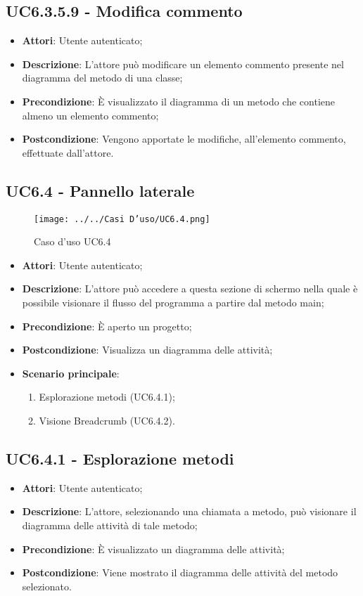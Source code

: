 \subsection{UC6.3.5.9 - Modifica commento} 
\label{ssec:UC6.3.5.9} 
\begin{itemize} 
\item \textbf{Attori}: Utente autenticato;
\item \textbf{Descrizione}: L'attore può modificare un elemento commento presente nel diagramma del metodo di una classe;
\item \textbf{Precondizione}: È visualizzato il diagramma di un metodo che contiene almeno un elemento commento;
\item \textbf{Postcondizione}: Vengono apportate le modifiche, all'elemento commento, effettuate dall'attore.
\end{itemize} 
\newpage
\subsection{UC6.4 - Pannello laterale} 
\label{ssec:UC6.4}

\begin{figure}[h!] 
\centering 
\texttt{[image: ../../Casi D'uso/UC6.4.png]} 
\caption{Caso d'uso UC6.4} 
 \end{figure} 
\begin{itemize} 
\item \textbf{Attori}: Utente autenticato;
\item \textbf{Descrizione}: L'attore può accedere a questa sezione di schermo nella quale è possibile visionare il flusso del programma a partire dal metodo main;
\item \textbf{Precondizione}: È aperto un progetto;
\item \textbf{Postcondizione}: Visualizza un diagramma delle attività;
\item \textbf{Scenario principale}: \begin{enumerate}\item Esplorazione metodi (UC6.4.1);\item Visione Breadcrumb (UC6.4.2). 
 \end{enumerate}
\end{itemize} 
\subsection{UC6.4.1 - Esplorazione metodi} 
\label{ssec:UC6.4.1} 
\begin{itemize} 
\item \textbf{Attori}: Utente autenticato;
\item \textbf{Descrizione}: L'attore, selezionando una chiamata a metodo, può visionare il diagramma delle attività di tale metodo;
\item \textbf{Precondizione}: È visualizzato un diagramma delle attività;
\item \textbf{Postcondizione}: Viene mostrato il diagramma delle attività del metodo selezionato.
\end{itemize} 
